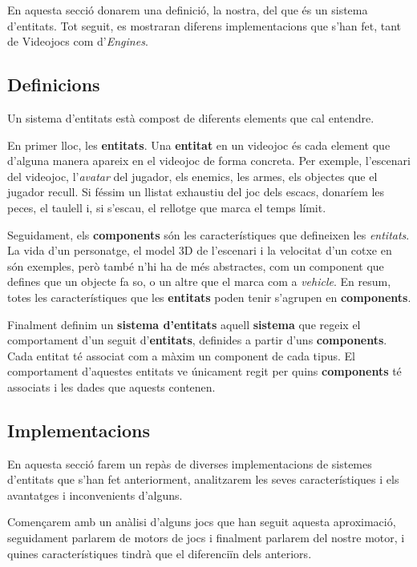 En aquesta secció donarem una definició, la nostra, del que és un sistema d'entitats. Tot seguit, es mostraran diferens implementacions que s'han fet, tant de Videojocs com d'{\em Engines}.

\subsection{Definicions}

Un sistema d'entitats està compost de diferents elements que cal entendre.

En primer lloc, les {\bf entitats}. Una {\bf entitat} en un videojoc és cada element que d'alguna manera apareix en el videojoc de forma concreta. Per exemple, l'escenari del videojoc, l'{\em avatar} del jugador, els enemics, les armes, els objectes que el jugador recull. Si féssim un llistat exhaustiu del joc dels escacs, donaríem les peces, el taulell i, si s'escau, el rellotge que marca el temps límit.

Seguidament, els {\bf components} són les característiques que defineixen les {\em entitats}. La vida d'un personatge, el model 3D de l'escenari i la velocitat d'un cotxe en són exemples, però també n'hi ha de més abstractes, com un component que defines que un objecte fa so, o un altre que el marca com a {\em vehicle}. En resum, totes les característiques que les {\bf entitats} poden tenir s'agrupen en {\bf components}.

Finalment definim un {\bf sistema d'entitats} aquell {\bf sistema} que regeix el comportament d'un seguit d'{\bf entitats}, definides a partir d'uns {\bf components}. Cada entitat té associat com a màxim un component de cada tipus. El comportament d'aquestes entitats ve únicament regit per quins {\bf components} té associats i les dades que aquests contenen.

\subsection{Implementacions}

En aquesta secció farem un repàs de diverses implementacions de sistemes d'entitats que s'han fet anteriorment, analitzarem les seves característiques i els avantatges i inconvenients d'alguns.

Començarem amb un anàlisi d'alguns jocs que han seguit aquesta aproximació, seguidament parlarem de motors de jocs i finalment parlarem del nostre motor, i quines característiques tindrà que el diferenciïn dels anteriors.


